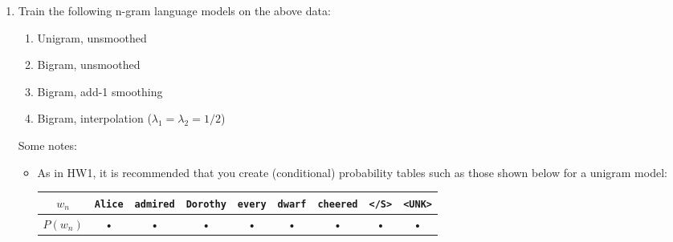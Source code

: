 \documentclass[11pt,letterpaper]{article}
\begin{document}
\begin{enumerate}

\item Train the following n-gram language models on the above data:

\begin{enumerate}

\item Unigram, unsmoothed

\item Bigram, unsmoothed

\item Bigram, add-1 smoothing

\item Bigram, interpolation ($\lambda_1=\lambda_2=1/2$)

\end{enumerate}

Some notes:

\begin{itemize}

\item As in HW1, it is recommended that you create (conditional) probability tables such as those shown below for a unigram model:
\begin{center}
\hspace*{-46pt}
\begin{tabular}{|c|c|c|c|c|c|c|c|c|}
\hline 
$w_n$ & \texttt{Alice} & \texttt{admired} & \texttt{Dorothy} & \texttt{every} & \texttt{dwarf} & \texttt{cheered} & \texttt{</S>} & \texttt{<UNK>} \\ 
\hline 
$P(w_n)$ & • & • & • & • & • & • & • & • \\ 
\hline 
\end{tabular}
\end{center} \newpage


\end{itemize}
\end{enumerate}
\end{document}
